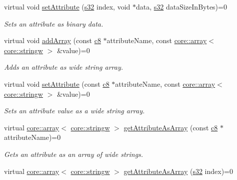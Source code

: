 \begin{DoxyCompactItemize}
virtual void \hyperlink{classirr_1_1io_1_1IAttributes_a26d06e1f7da14ce1bfb7b84c0b22dd64}{set\+Attribute} (\hyperlink{namespaceirr_ac66849b7a6ed16e30ebede579f9b47c6}{s32} index, void $\ast$data, \hyperlink{namespaceirr_ac66849b7a6ed16e30ebede579f9b47c6}{s32} data\+Size\+In\+Bytes)=0
\begin{DoxyCompactList}\small\item\em Sets an attribute as binary data. \end{DoxyCompactList}\item 
\mbox{\label{classirr_1_1io_1_1IAttributes_abbf204e53ef70b89fc25a98f01111031}} 
virtual void \hyperlink{classirr_1_1io_1_1IAttributes_abbf204e53ef70b89fc25a98f01111031}{add\+Array} (const \hyperlink{namespaceirr_a9395eaea339bcb546b319e9c96bf7410}{c8} $\ast$attribute\+Name, const \hyperlink{classirr_1_1core_1_1array}{core\+::array}$<$ \hyperlink{namespaceirr_1_1core_a5aedb62cb47cf01d1c548ab5e6344d2d}{core\+::stringw} $>$ \&value)=0
\begin{DoxyCompactList}\small\item\em Adds an attribute as wide string array. \end{DoxyCompactList}\item 
virtual void \hyperlink{classirr_1_1io_1_1IAttributes_a95abee2c34c3a438ba0df22d339b806e}{set\+Attribute} (const \hyperlink{namespaceirr_a9395eaea339bcb546b319e9c96bf7410}{c8} $\ast$attribute\+Name, const \hyperlink{classirr_1_1core_1_1array}{core\+::array}$<$ \hyperlink{namespaceirr_1_1core_a5aedb62cb47cf01d1c548ab5e6344d2d}{core\+::stringw} $>$ \&value)=0
\begin{DoxyCompactList}\small\item\em Sets an attribute value as a wide string array. \end{DoxyCompactList}\item 
virtual \hyperlink{classirr_1_1core_1_1array}{core\+::array}$<$ \hyperlink{namespaceirr_1_1core_a5aedb62cb47cf01d1c548ab5e6344d2d}{core\+::stringw} $>$ \hyperlink{classirr_1_1io_1_1IAttributes_af4fb7e071a70bc0e9c57099bc04eda4f}{get\+Attribute\+As\+Array} (const \hyperlink{namespaceirr_a9395eaea339bcb546b319e9c96bf7410}{c8} $\ast$attribute\+Name)=0
\begin{DoxyCompactList}\small\item\em Gets an attribute as an array of wide strings. \end{DoxyCompactList}\item 
virtual \hyperlink{classirr_1_1core_1_1array}{core\+::array}$<$ \hyperlink{namespaceirr_1_1core_a5aedb62cb47cf01d1c548ab5e6344d2d}{core\+::stringw} $>$ \hyperlink{classirr_1_1io_1_1IAttributes_a78e6562bd6e45c24d10c8cf77e3b317a}{get\+Attribute\+As\+Array} (\hyperlink{namespaceirr_ac66849b7a6ed16e30ebede579f9b47c6}{s32} index)=0

\end{DoxyCompactItemize}
